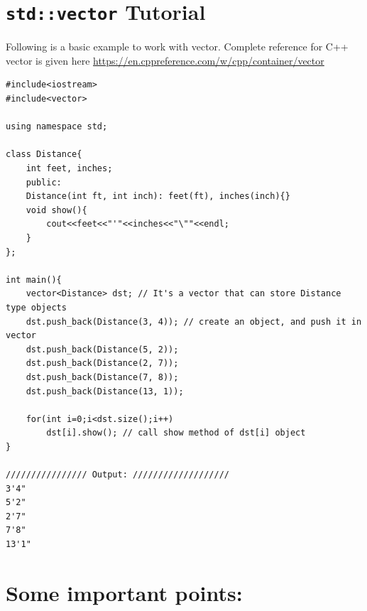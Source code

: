 \documentclass[a4paper,12pt]{article}
\begin{document}
	\section{\texttt{std::vector} Tutorial}
	
	Following is a basic example to work with vector. Complete reference for C++ vector is given here \url{https://en.cppreference.com/w/cpp/container/vector}
	\begin{lstlisting}
#include<iostream>
#include<vector>

using namespace std;

class Distance{
	int feet, inches;
	public:
	Distance(int ft, int inch): feet(ft), inches(inch){}
	void show(){
		cout<<feet<<"'"<<inches<<"\""<<endl;
	}
};

int main(){
	vector<Distance> dst; // It's a vector that can store Distance type objects
	dst.push_back(Distance(3, 4)); // create an object, and push it in vector
	dst.push_back(Distance(5, 2));
	dst.push_back(Distance(2, 7));
	dst.push_back(Distance(7, 8));
	dst.push_back(Distance(13, 1));
	
	for(int i=0;i<dst.size();i++)
		dst[i].show(); // call show method of dst[i] object
}

//////////////// Output: ///////////////////
3'4"
5'2"
2'7"
7'8"
13'1"
	\end{lstlisting}
	
	\section{Some important points:} 
	
\end{document}
